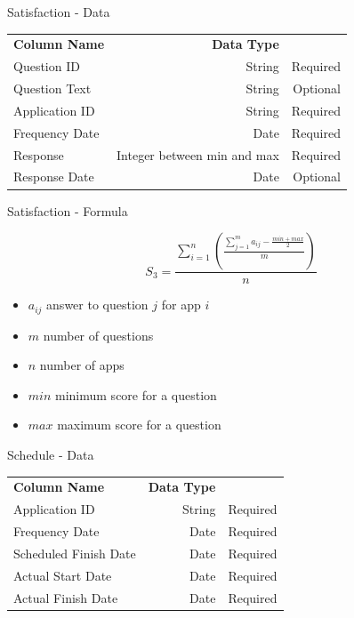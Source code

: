 \begin{frame}{Satisfaction - Data}
    
    \begin{tabular}{l | r | r}
        \textbf{Column Name} & \textbf{Data Type} &  \\
        
        Question ID & String  & Required \\
        Question Text & String  & Optional \\
        Application ID & String & Required \\
        Frequency Date & Date & Required \\
        Response & Integer between min and max  & Required \\
        Response Date & Date & Optional \\
    \end{tabular}
\end{frame}

\begin{frame}{Satisfaction - Formula}
    
    \[
        S_3 = \frac{\sum^n_{i=1}\left( \frac{\sum^m_{j=1}a_{ij}- \frac{min + max}{2}}{m}  \right)}{n}
    \]
    
    \begin{itemize}
        \item $a_{i j}$ answer to question $j$ for app $i$
        \item $m$ number of questions
        \item $n$ number of apps
        \item $min$ minimum score for a question
        \item $max$ maximum score for a question
    \end{itemize}
\end{frame}

\begin{frame}{Schedule - Data}
    
    \begin{tabular}{l | r | r}
        \textbf{Column Name} & \textbf{Data Type} &  \\
        
        Application ID & String  & Required \\
        Frequency Date & Date & Required \\
        Scheduled Finish Date & Date & Required \\
        Actual Start Date & Date  & Required \\
        Actual Finish Date & Date  & Required \\
    \end{tabular}
\end{frame}

